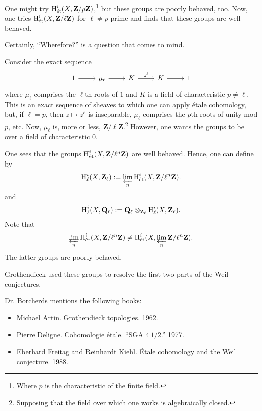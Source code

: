 \documentclass [11 pt, oneside] {article}
\begin{document}
One might try $\operatorname{H}_{\textup {\'et}}^{i}(X, \mathbf{Z}/p\mathbf{Z})$,\footnote{Where $p$ is the characteristic of the finite field.} but these groups are poorly behaved, too. Now, one tries $\operatorname{H}_{\textup {\'et}}^{i}(X, \mathbf{Z}/\ell\mathbf{Z})$ for $\ell\ne p$ prime and finds that these groups are well behaved.

Certainly, ``Wherefore?'' is a question that comes to mind.

Consider the exact sequence
\[
\begin{tikzcd}
	1\ar[r] & \mu_{\ell}\ar[r] & K\ar[r,"z^{\ell}"] & K\ar[r] &1
\end{tikzcd}
\]
where $\mu_{\ell}$ comprises the $\ell$th roots of $1$ and $K$ is a field of characteristic $p\ne \ell$. 
This is an exact sequence of sheaves to which one can apply \'etale cohomology, but, if $\ell=p$, then $z\longmapsto z^{\ell}$ is inseparable, $\mu_{\ell}$ comprises the $p$th roots of unity mod $p$, etc.
Now, $\mu_{\ell}$ is, more or less, $\mathbf{Z}/\ell\mathbf{Z}$.\footnote{Supposing that the field over which one works is algebraically closed.}
However, one wants the groups to be over a field of characteristic $0$.

One sees that the groups $\operatorname{H}_{\textup {\'et}}^{i}(X, \mathbf{Z}/\ell^{n}\mathbf{Z})$ are well behaved. Hence, one can define  by 
\begin{align*}
	\operatorname{H}^{i}_{\ell} (X, \mathbf{Z}_{\ell}) := \varprojlim_{n} \operatorname{H}_{\textup {\'et}}^{i}(X, \mathbf{Z}/\ell^{n}\mathbf{Z}).
\end{align*}
and
\begin{align*}
	\operatorname{H}^{i}_{\ell}(X,\mathbf{Q}_{\ell}) := \mathbf{Q}_{\ell} \otimes_{\mathbf{Z}_{\ell}} \operatorname{H}^{i}_{\ell} (X,\mathbf{Z}_{\ell}).
\end{align*}
Note that
\begin{align*}
	\varprojlim_{n} \operatorname{H}_{\textup {\'et}}^{i}(X, \mathbf{Z}/\ell^{n}\mathbf{Z})\ne \operatorname{H}_{\textup {\'et}}^{i}(X, \varprojlim_{n}\mathbf{Z}/\ell^{n}\mathbf{Z}).
\end{align*}
The latter groups are poorly behaved.

Grothendieck used these groups to resolve the first two parts of the Weil conjectures.

Dr. Borcherds mentions the following books:
\begin{itemize}
	\item Michael Artin. \ul{Grothendieck topologies}. 1962.
	\item Pierre Deligne. \ul{Cohomologie \'etale}. ``SGA $4\ 1/2$.'' 1977.
	\item Eberhard Freitag and Reinhardt Kiehl. \ul{\'Etale cohomology and the Weil conjecture}. 1988.
\end{itemize}
\end{document}
